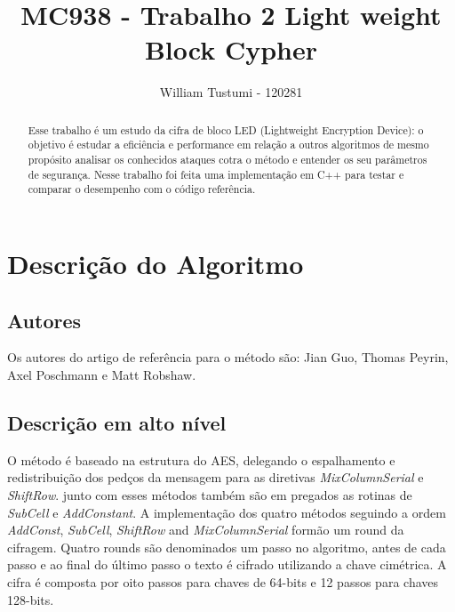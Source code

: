 \documentclass[runningheads,a4paper,11pt]{llncs}
\institute{Intituto de Computação - Unicamp}
\begin{document}
\title{MC938 - Trabalho 2 Light weight Block Cypher}
\titlerunning{}

\author{
	William Tustumi - 120281
}

\maketitle

\begin{abstract}
	Esse trabalho \'e um estudo da cifra de bloco LED (Lightweight Encryption Device): o objetivo \'e estudar a efici\^encia e performance em rela\c{c}\~ao a outros algoritmos de mesmo prop\'osito analisar os conhecidos ataques cotra o m\'etodo e entender os seu par\^ametros de seguran\c{c}a.
	Nesse trabalho foi feita uma implementa\c{c}\~ao em C++ para testar e comparar o desempenho com o c\'odigo refer\^encia.
\end{abstract}

\section{Descri\c{c}\~ao do Algoritmo}

\subsection{Autores}
Os autores do artigo de refer\^encia para o m\'etodo s\~ao: Jian Guo, Thomas Peyrin, Axel Poschmann e Matt Robshaw.

\subsection{Descri\c{c}\~ao em alto n\'ivel}
O m\'etodo \'e baseado na estrutura do AES, delegando o espalhamento e redistribui\c{c}\~ao dos ped\c{c}os da mensagem para as diretivas \textit{MixColumnSerial} e \textit{ShiftRow}. junto com esses m\'etodos tamb\'em s\~ao em pregados as rotinas de \textit{SubCell} e \textit{AddConstant}. A implementa\c{c}\~ao dos quatro m\'etodos seguindo a ordem \textit{AddConst}, \textit{SubCell}, \textit{ShiftRow} and \textit{MixColumnSerial} form\~ao um round da cifragem. Quatro rounds s\~ao denominados um passo no algoritmo, antes de cada passo e ao final do \'ultimo passo o texto \'e cifrado utilizando a chave cim\'etrica. A cifra \'e composta por oito passos para chaves de 64-bits e 12 passos para chaves 128-bits.
\end{document}

